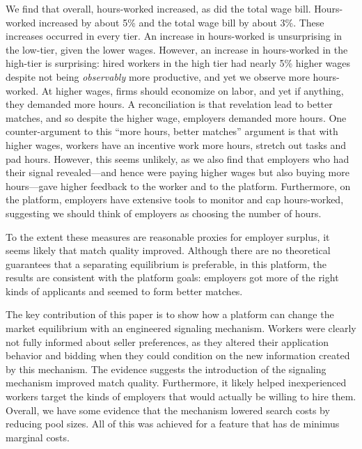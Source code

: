 We find that overall, hours-worked increased, as did the total wage bill.
Hours-worked increased by about 5\% and the total wage bill by about 3\%.
These increases occurred in every tier. 
An increase in hours-worked is unsurprising in the low-tier, given the lower wages. 
However, an increase in hours-worked in the high-tier is surprising: 
hired workers in the high tier had nearly 5\% higher wages despite not being \emph{observably} more productive, and yet we observe more hours-worked.
At higher wages, firms should economize on labor, and yet if anything, they demanded more hours.
A reconciliation is that revelation lead to better matches, and so despite the higher wage, employers demanded more hours.
One counter-argument to this ``more hours, better matches'' argument is that with higher wages, workers have an incentive work more hours, stretch out tasks and pad hours. 
However, this seems unlikely, as we also find that employers who had their signal revealed---and hence were paying higher wages but also buying more hours---gave higher feedback to the worker and to the platform.
Furthermore, on the platform, employers have extensive tools to monitor and cap hours-worked, suggesting we should think of employers as choosing the number of hours. 

To the extent these measures are reasonable proxies for employer surplus, it seems likely that match quality improved. 
Although there are no theoretical guarantees that a separating equilibrium is preferable, in this platform, the results are consistent with the platform goals:
employers got more of the right kinds of applicants and seemed to form better matches. 

The key contribution of this paper is to show how a platform can change the market equilibrium with an engineered signaling mechanism.
Workers were clearly not fully informed about seller preferences, as they altered their application behavior and bidding when they could condition on the new information created by this mechanism.
The evidence suggests the introduction of the signaling mechanism improved match quality.
Furthermore, it likely helped inexperienced workers target the kinds of employers that would actually be willing to hire them.
Overall, we have some evidence that the mechanism lowered search costs by reducing pool sizes.
All of this was achieved for a feature that has de minimus marginal costs.

